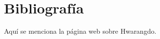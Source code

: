 \section{Bibliografía}

Aquí se menciona la página web sobre Hwarangdo\textregistered \cite{pagina-web}.


